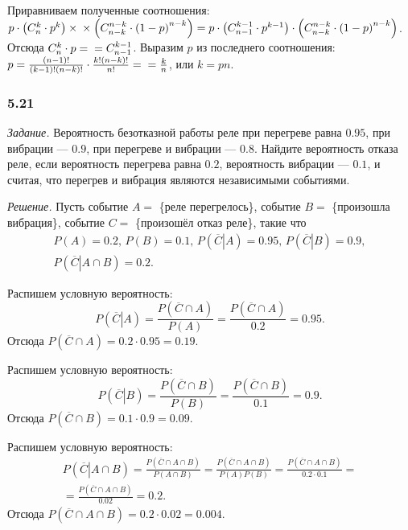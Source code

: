 Приравниваем полученные соотношения:
$p \cdot \left( C_n^k \cdot p^k \right) \times \\
\times \left( C_{n-k}^{n-k} \cdot \left( 1-p \right)^{n-k} \right) =
p \cdot \left( C_{n-1}^{k-1} \cdot p^{k-1} \right) \cdot \left( C_{n-k}^{n-k} \cdot \left(1-p \right)^{n-k} \right) $.
Отсюда $C_n^k \cdot p =  \\ = C_{n-1}^{k-1}$.
Выразим $p$ из последнего соотношения:
$p =
\frac{ \left( n-1 \right)!}{ \left( k-1 \right)! \left( n-k \right)!} \cdot \frac{ k! \left( n-k \right)!}{n!} = \\
= \frac{k}{n}$,
или $k = pn$.

\subsubsection*{5.21}

\textit{Задание.} Вероятность безотказной работы реле при перегреве равна $0.95$, при вибрации --- $0.9$, при перегреве и вибрации --- $0.8$.
Найдите вероятность отказа реле, если вероятность перегрева равна $0.2$, вероятность вибрации --- $0.1$, и считая, что перегрев и вибрация являются независимыми событиями.

\textit{Решение.}
Пусть событие $A =$ \{реле перегрелось\}, событие $B =$ \{произошла вибрация\}, событие $C =$ \{произошёл отказ реле\}, такие что
\begin{equation*}
\begin{split}
P \left( A \right) = 0.2, \,
P \left( B \right) = 0.1, \,
P \left( \left. \overline{C} \right| A \right) = 0.95, \,
P \left( \left. \overline{C} \right| B \right) = 0.9, \\
P \left( \left. \overline{C} \right| A \cap B \right) = 0.2.
\end{split}
\end{equation*}

Распишем условную вероятность:
$$P \left( \left. \overline{C} \right| A \right) =
\frac{P \left( \overline{C} \cap A \right) }{P \left( A \right) } =
\frac{P \left( \overline{C} \cap A \right) }{0.2} =
0.95.$$
Отсюда $P \left( \overline{C} \cap A \right) = 0.2 \cdot 0.95 = 0.19$.

Распишем условную вероятность:
$$P \left( \left. \overline{C} \right| B \right) =
\frac{P \left( \overline{C} \cap B \right) }{P \left( B \right) } =
\frac{P \left( \overline{C} \cap B \right) }{0.1} =
0.9.$$
Отсюда $P \left( \overline{C} \cap B \right) = 0.1 \cdot 0.9 = 0.09$.

Распишем условную вероятность:
\begin{equation*}
\begin{split}
P \left( \left. \overline{C} \right| A \cap B \right) =
\frac{P \left( \overline{C} \cap A \cap B \right) }{P \left( A \cap B \right) } =
\frac{P \left( \overline{C} \cap A \cap B \right) }{P \left( A \right) P \left( B \right) } =
\frac{P \left( \overline{C} \cap A \cap B \right) }{0.2 \cdot 0.1} = \\
= \frac{P \left( \overline{C} \cap A \cap B \right) }{0.02} =
0.2.
\end{split}
\end{equation*}
Отсюда $P \left( \overline{C} \cap A \cap B \right) = 0.2 \cdot 0.02 = 0.004$.

